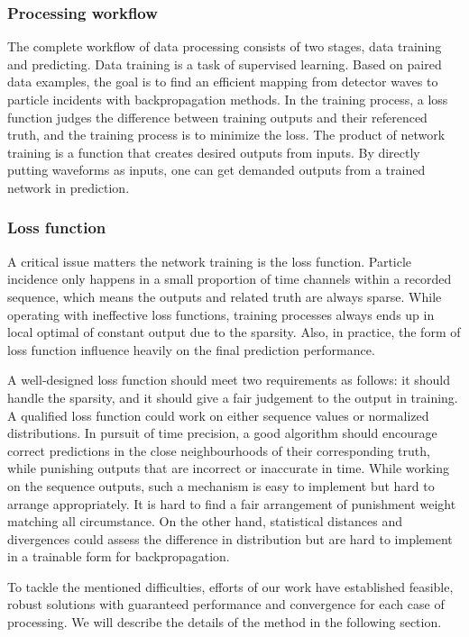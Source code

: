 \subsubsection{Processing workflow}

The complete workflow of data processing consists of two stages, data training and predicting. Data training is a task of supervised learning.  Based on paired data examples, the goal is to find an efficient mapping from detector waves to particle incidents with backpropagation methods. In the training process, a loss function judges the difference between training outputs and their referenced truth, and the training process is to minimize the loss. The product of network training is a function that creates desired outputs from inputs. By directly putting waveforms as inputs, one can get demanded outputs from a trained network in prediction.

\subsubsection{Loss function}

A critical issue matters the network training is the loss function. Particle incidence only happens in a small proportion of time channels within a recorded sequence, which means the outputs and related truth are always sparse. While operating with ineffective loss functions, training processes always ends up in local optimal of constant output due to the sparsity. Also, in practice, the form of loss function influence heavily on the final prediction performance. 

A well-designed loss function should meet two requirements as follows: it should handle the sparsity, and it should give a fair judgement to the output in training. A qualified loss function could work on either sequence values or normalized distributions. In pursuit of time precision, a good algorithm should encourage correct predictions in the close neighbourhoods of their corresponding truth, while punishing outputs that are incorrect or inaccurate in time. While working on the sequence outputs, such a mechanism is easy to implement but hard to arrange appropriately. It is hard to find a fair arrangement of punishment weight matching all circumstance. On the other hand, statistical distances and divergences could assess the difference in distribution but are hard to implement in a trainable form for backpropagation. 

To tackle the mentioned difficulties, efforts of our work have established feasible, robust solutions with guaranteed performance and convergence for each case of processing. We will describe the details of the method in the following section.

